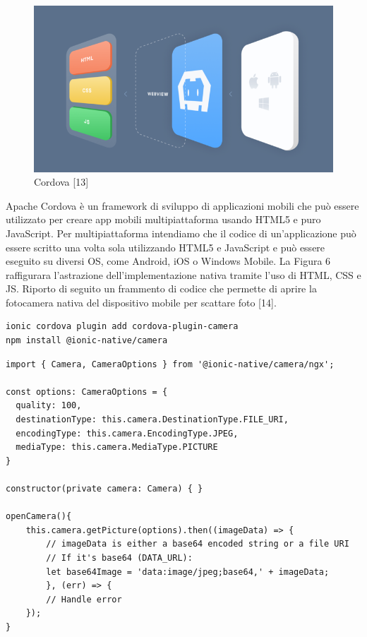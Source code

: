 \begin{figure}[h!]
    \centering  
    \caption{Cordova [13]}
    \includegraphics[scale=0.80]{img/cap2/cordova}
\end{figure}

Apache Cordova è un framework di sviluppo di applicazioni mobili che può essere utilizzato per creare app mobili multipiattaforma usando HTML5 e puro JavaScript. 
Per multipiattaforma intendiamo che il codice di un'applicazione può essere scritto una volta sola utilizzando HTML5 e JavaScript e può essere eseguito su diversi OS, come Android, iOS o Windows Mobile.
La Figura 6 raffigurara l'astrazione dell'implementazione nativa tramite l'uso di HTML, CSS e JS.
Riporto di seguito un frammento di codice che permette di aprire la fotocamera nativa del dispositivo mobile per scattare foto [14].
\\
\begin{lstlisting}
ionic cordova plugin add cordova-plugin-camera
npm install @ionic-native/camera
\end{lstlisting}

\begin{lstlisting}
import { Camera, CameraOptions } from '@ionic-native/camera/ngx';

const options: CameraOptions = {
  quality: 100,
  destinationType: this.camera.DestinationType.FILE_URI,
  encodingType: this.camera.EncodingType.JPEG,
  mediaType: this.camera.MediaType.PICTURE
}

constructor(private camera: Camera) { }

openCamera(){
    this.camera.getPicture(options).then((imageData) => {
        // imageData is either a base64 encoded string or a file URI
        // If it's base64 (DATA_URL):
        let base64Image = 'data:image/jpeg;base64,' + imageData;
        }, (err) => {
        // Handle error
    });
}
\end{lstlisting}

